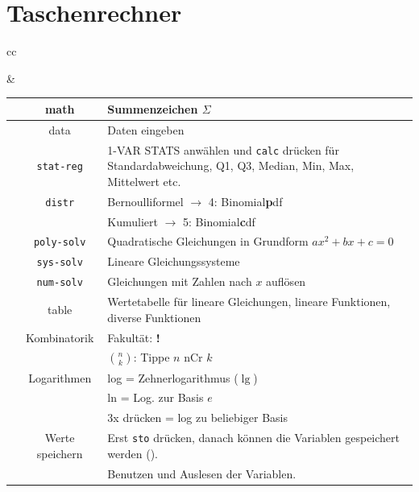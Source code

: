 
\section*{Taschenrechner}

\begin{tabular}{cc}


&

\begin{tabular}{c|c|p{80mm}}\hline
\tiprobutton{math}         &math              & Summenzeichen $\Sigma$ \\\hline
\tiprobutton{data}         &data              & Daten eingeben\\
                           &\texttt{stat-reg} & 1-VAR STATS anwählen
und \texttt{calc} drücken für Standardabweichung, Q1, Q3, Median, Min,
Max, Mittelwert etc.\\
                           &\texttt{distr}    & Bernoulliformel $\rightarrow$ 4: Binomial\textbf{p}df\\
                           &                  & Kumuliert $\rightarrow$ 5: Binomial\textbf{c}df\\\hline
\tiprobutton{cos_poly-solv}&\texttt{poly-solv}&  Quadratische Gleichungen in Grundform $ax^2+bx+c=0$\\\hline
\tiprobutton{tan_sys-solv} &\texttt{sys-solv} &  Lineare Gleichungssysteme\\\hline
\tiprobutton{sin_num-solv} &\texttt{num-solv} &  Gleichungen mit Zahlen nach $x$ auf\/lösen\\\hline
\tiprobutton{table}        & table            &  Wertetabelle für lineare Gleichungen, lineare Funktionen, diverse Funktionen\\\hline
\tiprobutton{ncrnpr}       &Kombinatorik      &  Fakultät: {\color{red}\textbf{!}}\\
                           &                  &  $n \choose k$: Tippe $n$ nCr $k$\\\hline
\tiprobutton{ln_log}       &  Logarithmen     &  log = Zehnerlogarithmus ($\lg$)\\
                           &                  &  ln  = Log. zur Basis $e$\\
                           &                  &  3x drücken = log zu beliebiger Basis\\\hline
\tiprobutton{sto_recall}   & Werte speichern  &  Erst \texttt{sto} drücken, danach können die Variablen gespeichert werden (\tiprobutton{xyzabcd}). \\\hline
\tiprobutton{xyzabcd}      &                  & Benutzen und Auslesen der Variablen.
\end{tabular}
\end{tabular}


